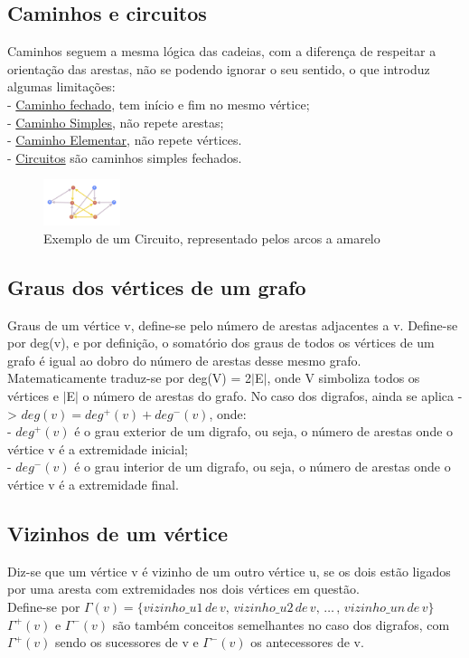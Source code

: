 \subsection{Caminhos e circuitos}
Caminhos seguem a mesma lógica das cadeias, com a diferença de respeitar a orientação das arestas, não 
se podendo ignorar o seu sentido, o que introduz algumas limitações:\\
\indent - \underline{Caminho fechado}, tem início e fim no mesmo vértice;\\
\indent - \underline{Caminho Simples}, não repete arestas;\\
\indent - \underline{Caminho Elementar}, não repete vértices.\\
\indent - \underline{Circuitos} são caminhos simples fechados.\\

\begin{figure}[h]
    \centering
    \includegraphics[width=0.2\textwidth]{imgs/Figura10}
    \caption{Exemplo de um Circuito, representado pelos arcos a amarelo
    \label{fig:imagem10}}
\end{figure}

\subsection{Graus dos vértices de um grafo}
Graus de um vértice v, define-se pelo número de arestas adjacentes a v. Define-se por deg(v), e por 
definição, o somatório dos graus de todos os vértices de um grafo é igual ao dobro do número de arestas 
desse mesmo grafo.\\
\indent Matematicamente traduz-se por  deg(V) = 2$\vert$E$\vert$, onde V simboliza todos os vértices e $\vert$E$\vert$ o número de 
arestas do grafo. No caso dos digrafos, ainda se aplica -> $deg(v) = deg^+(v) + deg^-(v)$, onde:\\
\indent - $deg^+(v)$ é o grau exterior de um digrafo, ou seja, o número de arestas onde o vértice v é a extremidade 
inicial;\\
\indent - $deg^-(v)$ é o grau interior de um digrafo, ou seja, o número de arestas onde o vértice v é a extremidade 
final.

\subsection{ Vizinhos de um vértice}
Diz-se que um vértice v é vizinho de um outro vértice u, se os dois estão ligados por uma aresta com 
extremidades nos dois vértices em questão.\\
\indent Define-se por $\Gamma(v)= \{ vizinho\_u1\,de\,v,\,vizinho\_u2\,de\,v,\,…\,,\,vizinho\_un\,de\,v \}$\\

$\Gamma^+(v)$ e $\Gamma^-(v)$ são também conceitos semelhantes no caso dos digrafos, com $\Gamma^+(v)$ sendo os sucessores de v e $\Gamma^-(v)$ os antecessores de v.
